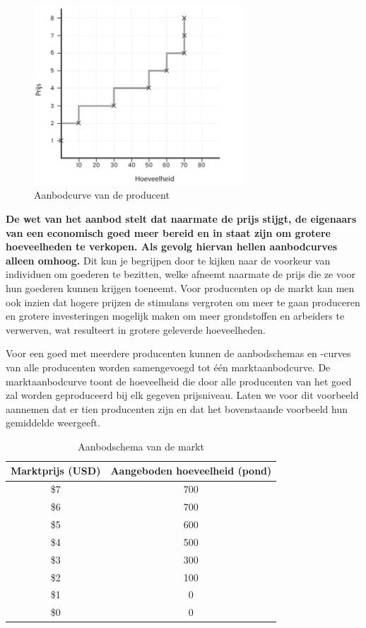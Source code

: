 \begin{figure}[H]
\centering
    \includegraphics[width=0.7\textwidth]{figures/fig24-1.png}
    \caption[Aanbodcurve van de producent]{Aanbodcurve van de producent}
    \label{fig24}
\end{figure}

\textbf{De wet van het aanbod stelt dat naarmate de prijs stijgt, de eigenaars van een economisch goed meer bereid en in staat zijn om grotere hoeveelheden te verkopen. Als gevolg hiervan hellen aanbodcurves alleen omhoog.} Dit kun je begrijpen door te kijken naar de voorkeur van individuen om goederen te bezitten, welke afneemt naarmate de prijs die ze voor hun goederen kunnen krijgen toeneemt. Voor producenten op de markt kan men ook inzien dat hogere prijzen de stimulans vergroten om meer te gaan produceren en grotere investeringen mogelijk maken om meer grondstoffen en arbeiders te verwerven, wat resulteert in grotere geleverde hoeveelheden.

Voor een goed met meerdere producenten kunnen de aanbodschema\textquotesingle s en -curves van alle producenten worden samengevoegd tot één marktaanbodcurve. De marktaanbodcurve toont de hoeveelheid die door alle producenten van het goed zal worden geproduceerd bij elk gegeven prijsniveau. Laten we voor dit voorbeeld aannemen dat er tien producenten zijn en dat het bovenstaande voorbeeld hun gemiddelde weergeeft.

\begin{table}[H]
\centering
\begin{tabular}{|c|c|}  %
\hline  %
    \cellcolor{gray!25}Marktprijs (USD) &
    \cellcolor{gray!25}Aangeboden hoeveelheid (pond) \\
\hline  %
 \$7 & 700 \\ \hline
 \$6 & 700 \\ \hline
 \$5 & 600 \\ \hline
 \$4 & 500 \\ \hline
 \$3 & 300 \\ \hline
 \$2 & 100 \\ \hline
 \$1 & 0  \\ \hline
 \$0 & 0  \\ \hline  %
\end{tabular}
\caption{Aanbodschema van de markt}
\label{tab6}
\end{table}

